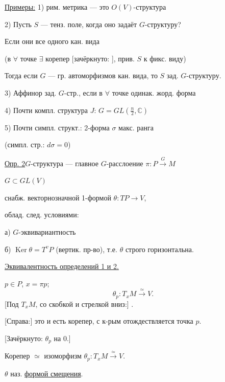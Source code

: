 \underline{Примеры:} 1) рим. метрика — это $O(V)$-структура

2) Пусть $S$ — тенз. поле, когда оно задаёт $G$-структуру?

Если они все одного кан. вида

(в $\forall$ точке $\exists$ корепер
[зачёркнуто: ], прив. $S$ к фикс. виду)

Тогда если $G$ — гр. автоморфизмов кан. вида, то $S$ зад. $G$-структуру.

3) Аффинор зад. $G$-стр., если в $\forall$ точке одинак. жорд. форма

4) Почти компл. структура $J$: $G=GL\left(\frac{n}{2},\mathbb{C}\right)$

5) Почти симпл. структ.: 2-форма $\sigma$ макс. ранга

(симпл. стр.: $d\sigma=0$)

\underline{Опр. 2}\quad $G$-структура — главное $G$-расслоение
$\pi\colon P\overset{G}{\longrightarrow}M$

$G\subset GL(V)$

снабж. векторнозначной 1-формой $\theta\colon TP\to V$,

облад. след. условиями:


а) $G$-эквивариантность

б) $\operatorname{Ker}\theta=T^vP$ (вертик. пр-во), т.е. $\theta$ строго горизонтальна.

\underline{Эквивалентность определений 1 и 2.}

$p\in P$, $x=\pi p$;
\begin{equation*}
\theta_p\colon T_xM\overset{\simeq}{\longrightarrow}V.
\end{equation*}
[Под $T_xM$, со скобкой и стрелкой вниз:]
.

[Справа:] это и есть корепер, с к-рым отождествляется точка $p$.

[Зачёркнуто: $\theta_p$ на  $0$.]

Корепер $\simeq$ изоморфизм $\theta_p\colon T_xM\overset{\simeq}{\longrightarrow}V$.

$\theta$ наз. \underline{формой смещения}.

